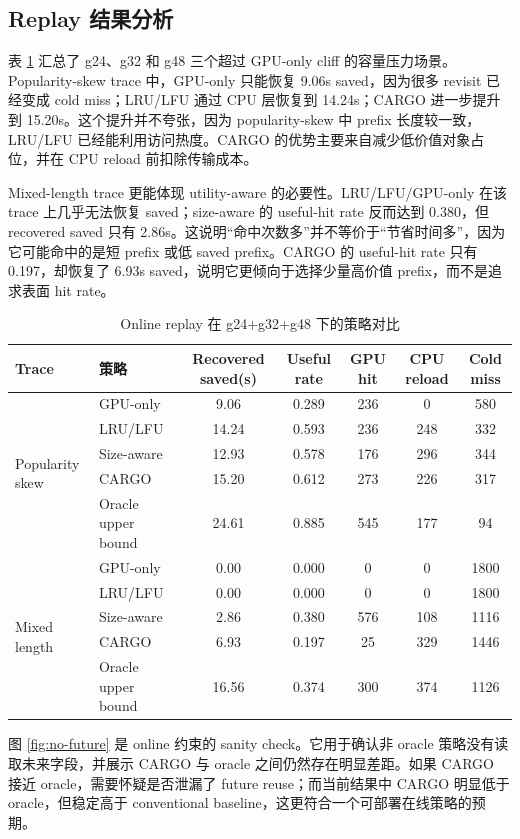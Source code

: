 \documentclass[UTF8,a4paper,10pt]{ctexart}
\begin{document}
\subsection{Replay 结果分析}

表 \ref{tab:cargo-summary} 汇总了 g24、g32 和 g48 三个超过 GPU-only cliff 的容量压力场景。Popularity-skew trace 中，GPU-only 只能恢复 9.06s saved，因为很多 revisit 已经变成 cold miss；LRU/LFU 通过 CPU 层恢复到 14.24s；CARGO 进一步提升到 15.20s。这个提升并不夸张，因为 popularity-skew 中 prefix 长度较一致，LRU/LFU 已经能利用访问热度。CARGO 的优势主要来自减少低价值对象占位，并在 CPU reload 前扣除传输成本。

Mixed-length trace 更能体现 utility-aware 的必要性。LRU/LFU/GPU-only 在该 trace 上几乎无法恢复 saved；size-aware 的 useful-hit rate 反而达到 0.380，但 recovered saved 只有 2.86s。这说明“命中次数多”并不等价于“节省时间多”，因为它可能命中的是短 prefix 或低 saved prefix。CARGO 的 useful-hit rate 只有 0.197，却恢复了 6.93s saved，说明它更倾向于选择少量高价值 prefix，而不是追求表面 hit rate。

\begin{table}[H]
\centering
\small
\caption{Online replay 在 g24+g32+g48 下的策略对比}
\label{tab:cargo-summary}
\begin{tabular}{llccccc}
\toprule
Trace & 策略 & Recovered saved(s) & Useful rate & GPU hit & CPU reload & Cold miss \\
\midrule
\multirow{5}{*}{Popularity skew}
& GPU-only & 9.06 & 0.289 & 236 & 0   & 580 \\
& LRU/LFU  & 14.24 & 0.593 & 236 & 248 & 332 \\
& Size-aware & 12.93 & 0.578 & 176 & 296 & 344 \\
& CARGO & 15.20 & 0.612 & 273 & 226 & 317 \\
& Oracle upper bound & 24.61 & 0.885 & 545 & 177 & 94 \\
\midrule
\multirow{5}{*}{Mixed length}
& GPU-only & 0.00 & 0.000 & 0 & 0   & 1800 \\
& LRU/LFU  & 0.00 & 0.000 & 0 & 0   & 1800 \\
& Size-aware & 2.86 & 0.380 & 576 & 108 & 1116 \\
& CARGO & 6.93 & 0.197 & 25 & 329 & 1446 \\
& Oracle upper bound & 16.56 & 0.374 & 300 & 374 & 1126 \\
\bottomrule
\end{tabular}
\end{table}

图 \ref{fig:no-future} 是 online 约束的 sanity check。它用于确认非 oracle 策略没有读取未来字段，并展示 CARGO 与 oracle 之间仍然存在明显差距。如果 CARGO 接近 oracle，需要怀疑是否泄漏了 future reuse；而当前结果中 CARGO 明显低于 oracle，但稳定高于 conventional baseline，这更符合一个可部署在线策略的预期。
\end{document}

